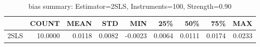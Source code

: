 \begin{table}[ht]
\centering
\caption{bias summary: Estimator=2SLS, Instruments=100, Strength=0.90}
\begin{tabular}{lrrrrrrrr}
\toprule
 & COUNT & MEAN & STD & MIN & 25\% & 50\% & 75\% & MAX \\
\midrule
2SLS & 10.0000 & 0.0118 & 0.0082 & -0.0023 & 0.0064 & 0.0111 & 0.0174 & 0.0233 \\
\bottomrule
\end{tabular}
\end{table}
